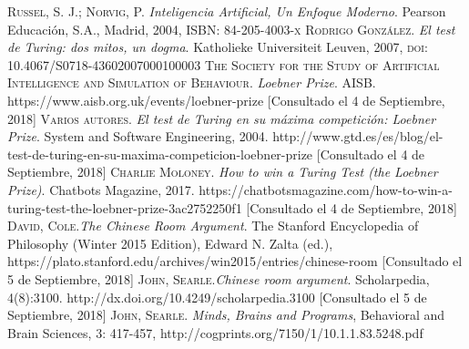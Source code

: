 \documentclass{article}
\begin{document}
\begin{thebibliography}{9}
	\newblock \textsc{Russel, S. J.; Norvig, P.} \textit{Inteligencia Artificial, Un Enfoque Moderno}. Pearson Educaci\'on, S.A., Madrid, 2004, \textsc{ISBN: 84-205-4003-x}
	 \textsc{Rodrigo Gonz\'alez}. \textit{El test de Turing: dos mitos, un dogma}. Katholieke Universiteit Leuven, 2007, \textsc{doi: 10.4067/S0718-43602007000100003}
	 \textsc{The Society for the Study of Artificial Intelligence and Simulation of Behaviour}. \textit{Loebner Prize}. AISB. https://www.aisb.org.uk/events/loebner-prize [Consultado el 4 de Septiembre, 2018]
	 \textsc{Varios autores}. \textit{El test de Turing en su m\'axima competici\'on: Loebner Prize}. System and Software Engineering, 2004. http://www.gtd.es/es/blog/el-test-de-turing-en-su-maxima-competicion-loebner-prize [Consultado el 4 de Septiembre, 2018]
	 \textsc{Charlie Moloney}. \textit{How to win a Turing Test (the Loebner Prize)}. Chatbots Magazine, 2017. https://chatbotsmagazine.com/how-to-win-a-turing-test-the-loebner-prize-3ac2752250f1 [Consultado el 4 de Septiembre, 2018]
	 \textsc{David, Cole}.\textit{The Chinese Room Argument}. The Stanford Encyclopedia of Philosophy (Winter 2015 Edition), Edward N. Zalta (ed.), https://plato.stanford.edu/archives/win2015/entries/chinese-room [Consultado el 5 de Septiembre, 2018]
	 \textsc{John, Searle}.\textit{Chinese room argument}. Scholarpedia, 4(8):3100. http://dx.doi.org/10.4249/scholarpedia.3100 [Consultado el 5 de Septiembre, 2018]
	 \textsc{John, Searle}. \textit{Minds, Brains and Programs}, Behavioral and Brain Sciences, 3: 417-457, http://cogprints.org/7150/1/10.1.1.83.5248.pdf
\end{thebibliography}
\end{document}
